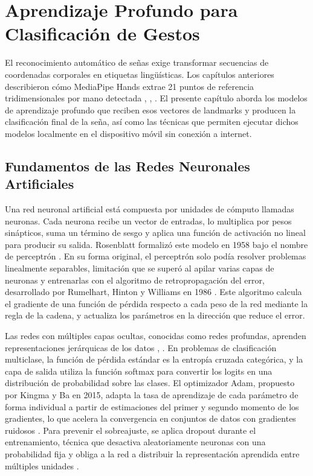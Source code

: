 \chapter{Aprendizaje Profundo para Clasificación de Gestos}
\label{cp:aprendizaje-profundo}

\insertminitoc
\parindent0pt

El reconocimiento automático de señas exige transformar secuencias de coordenadas
corporales en etiquetas lingüísticas. Los capítulos anteriores describieron cómo
MediaPipe Hands extrae 21 puntos de referencia tridimensionales por mano detectada
\cite{zhang_mediapipe_2020}, \cite{bazarevsky_blazepalm_2019},
\cite{lugaresi_mediapipe_2019}. El presente capítulo aborda los modelos de aprendizaje
profundo que reciben esos vectores de landmarks y producen la clasificación final de
la seña, así como las técnicas que permiten ejecutar dichos modelos localmente en el
dispositivo móvil sin conexión a internet.

\section{Fundamentos de las Redes Neuronales Artificiales}

Una red neuronal artificial está compuesta por unidades de cómputo llamadas neuronas.
Cada neurona recibe un vector de entradas, lo multiplica por pesos sinápticos, suma un
término de sesgo y aplica una función de activación no lineal para producir su salida.
Rosenblatt formalizó este modelo en 1958 bajo el nombre de perceptrón
\cite{rosenblatt_perceptron_1958}. En su forma original, el perceptrón solo podía
resolver problemas linealmente separables, limitación que se superó al apilar varias
capas de neuronas y entrenarlas con el algoritmo de retropropagación del error,
desarrollado por Rumelhart, Hinton y Williams en 1986 \cite{rumelhart_backprop_1986}.
Este algoritmo calcula el gradiente de una función de pérdida respecto a cada peso de
la red mediante la regla de la cadena, y actualiza los parámetros en la dirección que
reduce el error.

Las redes con múltiples capas ocultas, conocidas como redes profundas, aprenden
representaciones jerárquicas de los datos \cite{goodfellow_deep_2016},
\cite{lecun_deep_2015}. En problemas de clasificación multiclase, la función de pérdida
estándar es la entropía cruzada categórica, y la capa de salida utiliza la función
softmax para convertir los logits en una distribución de probabilidad sobre las clases.
El optimizador Adam, propuesto por Kingma y Ba en 2015, adapta la tasa de aprendizaje
de cada parámetro de forma individual a partir de estimaciones del primer y segundo
momento de los gradientes, lo que acelera la convergencia en conjuntos de datos con
gradientes ruidosos \cite{kingma_adam_2015}. Para prevenir el sobreajuste, se aplica
dropout durante el entrenamiento, técnica que desactiva aleatoriamente neuronas con una
probabilidad fija y obliga a la red a distribuir la representación aprendida entre
múltiples unidades \cite{srivastava_dropout_2014}.

